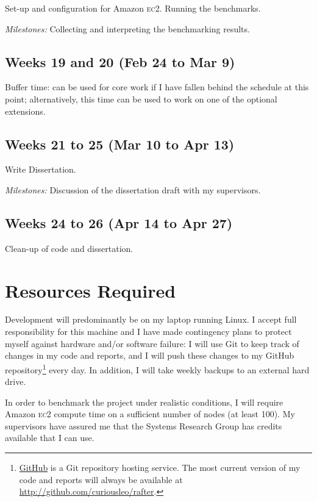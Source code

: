 \documentclass[12pt,chapterprefix=true,toc=bibliography,numbers=noendperiod,
               footnotes=multiple,twoside]{scrreprt}
\begin{document}
Set-up and configuration for Amazon \textsc{ec2}. Running the benchmarks.

\emph{Milestones:} Collecting and interpreting the benchmarking results.

\subsection*{Weeks 19 and 20 (Feb 24 to Mar 9)%
  \label{weeks-19-and-20-feb-24-to-mar-9}%
}

Buffer time: can be used for core work if I have fallen behind the schedule at this point; alternatively, this time can be used to work on one of the optional extensions.

\subsection*{Weeks 21 to 25 (Mar 10 to Apr 13)%
  \label{weeks-21-to-25-mar-10-to-apr-13}%
}

Write Dissertation.

\emph{Milestones:} Discussion of the dissertation draft with my supervisors.

\subsection*{Weeks 24 to 26 (Apr 14 to Apr 27)%
  \label{weeks-24-to-26-apr-14-to-apr-27}%
}

Clean-up of code and dissertation.

\section*{Resources Required%
  \label{resources-required}%
}
%
Development will predominantly be on my laptop running Linux. I accept full responsibility for this machine and I have made contingency plans to protect myself against hardware and/or software failure: I will use Git to keep track of changes in my code and reports, and I will push these changes to my GitHub repository\footnote{\href{http://github.com}{GitHub} is a Git repository hosting service. The most current version of my code and reports will always be available at \url{http://github.com/curiousleo/rafter}.}  every day. In addition, I will take weekly backups to an external hard drive.

In order to benchmark the project under realistic conditions, I will require Amazon \textsc{ec2} compute time on a sufficient number of nodes (at least 100). My supervisors have assured me that the Systems Research Group has credits available that I can use.




%
%

\end{document}
